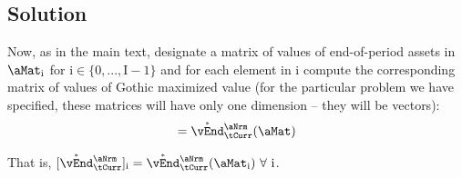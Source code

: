 \documentclass[./SolvingMicroDSOPs]{subfiles}
\begin{document}
\subsection{Solution}

\newcommand{\aIdx}{\mathrm{i}}
\newcommand{\aCnt}{\mathrm{I}}
\newcommand{\bIdx}{\mathrm{j}}
\newcommand{\bCnt}{\mathrm{J}}
Now, as in the main text, designate a matrix of values of end-of-period assets in $\aMat_{\aIdx}$ for $\aIdx \in \{0,...,\aCnt-1\}$ and for each element in $\aIdx$ compute the corresponding matrix of values of Gothic maximized value (for the particular problem we have specified, these matrices will have only one dimension -- they will be vectors):
\begin{align}
  [\Maxed{\vEnd}^{\aNrm}_{\tCurr}]=\Maxed{\vEnd}^{\aNrm}_{\tCurr}(\aMat) 
\end{align}

That is, $[\Maxed{\vEnd}^{\aNrm}_{\tCurr}]_{\aIdx} = \Maxed{\vEnd}^{\aNrm}_{\tCurr}(\aMat_{\aIdx})~\forall~\aIdx$.
\end{document}
